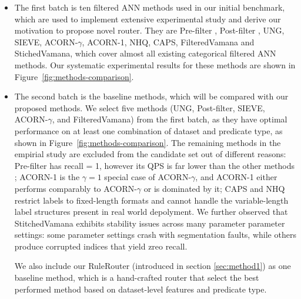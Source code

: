 \begin{itemize}
    \item The first batch is ten filtered ANN methods used in our initial benchmark, which are used to implement extensive experimental study and derive our motivation to propose novel router. They are Pre-filter \cite{FilteredANNBenchmark2024}, Post-filter \cite{FilteredANNBenchmark2024}, UNG\cite{UNG2024}, SIEVE\cite{SIEVE2025}, ACORN-$\gamma$, ACORN-1\cite{ACORN2024}, NHQ\cite{NHQNPG2023}, CAPS\cite{CAPS2023}, FilteredVamana and StichedVamana\cite{FilteredStitchedVamana2023}, which cover almost all existing categorical filtered ANN methods. Our systematic experimental results for these methods are shown in Figure~\ref{fig:methods-comparison}.

    \item The second batch is the baseline methods, which will be compared with our proposed methods. We select five methods (UNG, Post-filter, SIEVE, ACORN-$\gamma$, and FilteredVamana) from the first batch, as they have optimal performance on at least one combination of dataset and predicate type, as shown in Figure~\ref{fig:methods-comparison}. 
The remaining methods in the empirial study are excluded from the candidate set out of different reasons: Pre-filter has recall = 1, however its QPS is far lower than the other methods%
; ACORN-1 is the $\gamma=1$ special case of ACORN-$\gamma$, and ACORN-1 either performs comparably to ACORN-$\gamma$ or is dominated by it; CAPS and NHQ restrict labels to fixed-length formats and cannot handle the variable-length label structures present in real world depolyment. We further observed that StitchedVamana exhibits stability issues across many parameter parameter settings: some parameter settings crash with segmentation faults, while others %
produce corrupted indices that yield zreo recall. %

We also include our RuleRouter (introduced in section \ref{sec:method1}) as one baseline method, which is a hand-crafted router that select the best performed method based on dataset-level features and predicate type.


\end{itemize}
